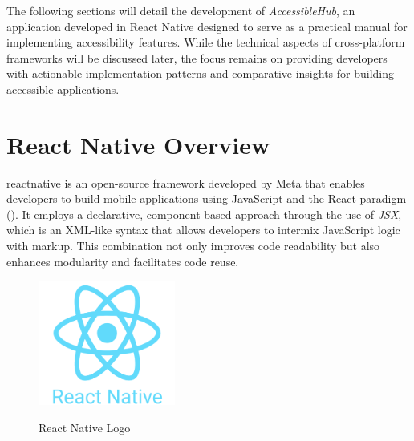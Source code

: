 The following sections will detail the development of \textit{AccessibleHub}, an application developed in React Native designed to serve as a practical manual for implementing accessibility features. While the technical aspects of cross-platform frameworks will be discussed later, the focus remains on providing developers with actionable implementation patterns and comparative insights for building accessible applications.

\section{React Native Overview}
\label{sec:reactnative-overview}

\gls{reactnative} is an open-source framework developed by Meta that enables developers to build mobile applications using JavaScript and the React paradigm (\cite{site:reactnative}). It employs a declarative, component-based approach through the use of \textit{JSX}, which is an XML-like syntax that allows developers to intermix JavaScript logic with markup. This combination not only improves code readability but also enhances modularity and facilitates code reuse.

\begin{figure}[ht]
    \centering
    \includegraphics[width=0.4\textwidth, alt={React Native Logo}]{img/react-native-logo.png}
    \caption{React Native Logo}
\label{fig:reactnative-logo}
\end{figure}

